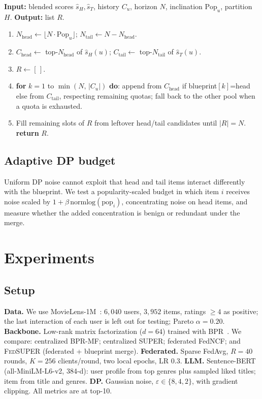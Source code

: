 \documentclass{article}
\newcommand{\Fed}{\textsc{FedSUPER}}
\newcommand{\Pop}{\mathrm{Pop}}
\begin{document}
\begin{algorithm}[t]
\caption{Blueprint merge (hard quota / soft blueprint), optional LLM blend}
\label{alg:merge}
\textbf{Input:} blended scores \(\widehat{s}_H,\widehat{s}_T\), history \(C_u\), horizon \(N\), inclination \(\Pop_u\), partition \(H\). \textbf{Output:} list \(R\).
\begin{enumerate}
\item \(N_{\mathrm{head}} \leftarrow \lfloor N\cdot\Pop_u\rfloor\); \quad \(N_{\mathrm{tail}} \leftarrow N-N_{\mathrm{head}}\).
\item \(C_{\mathrm{head}} \leftarrow\) top-\(N_{\mathrm{head}}\) of \(\widehat{s}_H(u)\); \quad \(C_{\mathrm{tail}} \leftarrow\) top-\(N_{\mathrm{tail}}\) of \(\widehat{s}_T(u)\).
\item \(R \leftarrow [\,]\).
\item \textbf{for} \(k=1\) to \(\min(N,\,|C_u|)\) \textbf{do}: append from \(C_{\mathrm{head}}\) if blueprint\([k]\)=head else from \(C_{\mathrm{tail}}\), respecting remaining quotas; fall back to the other pool when a quota is exhausted.
\item Fill remaining slots of \(R\) from leftover head/tail candidates until \(|R|=N\). \textbf{return} \(R\).
\end{enumerate}
\end{algorithm}

\subsection{Adaptive DP budget}

Uniform DP noise cannot exploit that head and tail items interact differently with the blueprint.
We test a popularity-scaled budget in which item \(i\) receives noise scaled by
\(1+\beta\,\mathrm{normlog}(\mathrm{pop}_i)\), concentrating noise on head items, and measure
whether the added concentration is benign or redundant under the merge.

\section{Experiments}
\label{sec:experiments}

\subsection{Setup}

\textbf{Data.} We use MovieLens-1M~\cite{harper2015movielens}: \(6{,}040\) users, \(3{,}952\)
items, ratings \(\ge 4\) as positive; the last interaction of each user is left out for testing;
Pareto \(\alpha=0.20\). \textbf{Backbone.} Low-rank matrix factorization (\(d{=}64\)) trained with
BPR~\cite{rendle2009bpr}. We compare: centralized BPR-MF; centralized SUPER; federated FedNCF; and
\Fed{} (federated + blueprint merge). \textbf{Federated.} Sparse FedAvg, \(R{=}40\) rounds,
\(K{=}256\) clients/round, two local epochs, LR \(0.3\). \textbf{LLM.} Sentence-BERT
(all-MiniLM-L6-v2, 384-d): user profile from top genres plus sampled liked titles; item from title
and genres. \textbf{DP.} Gaussian noise, \(\varepsilon\in\{8,4,2\}\), with gradient clipping. All
metrics are at top-10.
\end{document}
